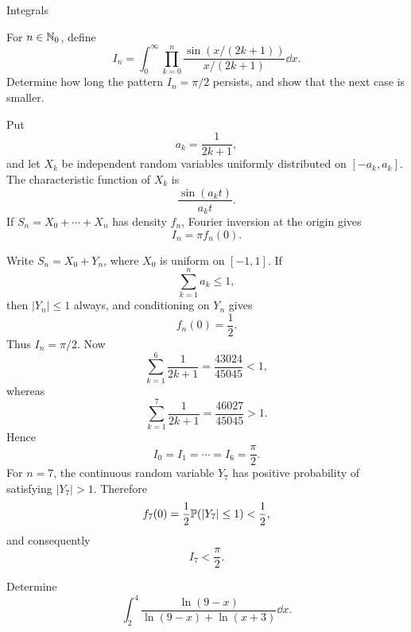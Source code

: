 \begin{expectedproblemgroup}{Integrals}
        \begin{expectedsubproblem}
            For $n\in\mathbb{N}_0$, define
            \[
                I_n
                =
                \int_0^{\infty}
                \prod_{k=0}^{n}
                \frac{\sin(x/(2k+1))}{x/(2k+1)}\dd x.
            \]
            Determine how long the pattern $I_n=\pi/2$ persists, and show that
            the next case is smaller.
        \end{expectedsubproblem}

        \begin{expectedsubsolution}
            Put
            \[
                a_k=\frac{1}{2k+1},
            \]
            and let $X_k$ be independent random variables uniformly distributed on
            $[-a_k,a_k]$. The characteristic function of $X_k$ is
            \[
                \frac{\sin(a_k t)}{a_k t}.
            \]
            If $S_n=X_0+\cdots+X_n$ has density $f_n$, Fourier inversion at the
            origin gives
            \[
                I_n=\pi f_n(0).
            \]

            Write $S_n=X_0+Y_n$, where $X_0$ is uniform on $[-1,1]$. If
            \[
                \sum_{k=1}^{n}a_k\leq1,
            \]
            then $|Y_n|\leq1$ always, and conditioning on $Y_n$ gives
            \[
                f_n(0)=\frac12.
            \]
            Thus $I_n=\pi/2$. Now
            \[
                \sum_{k=1}^{6}\frac{1}{2k+1}
                =
                \frac{43024}{45045}<1,
            \]
            whereas
            \[
                \sum_{k=1}^{7}\frac{1}{2k+1}
                =
                \frac{46027}{45045}>1.
            \]
            Hence
            \[
                \boxed{I_0=I_1=\cdots=I_6=\frac{\pi}{2}}.
            \]
            For $n=7$, the continuous random variable $Y_7$ has positive
            probability of satisfying $|Y_7|>1$. Therefore
            \[
                f_7(0)
                =
                \frac12\mathbb{P}(|Y_7|\leq1)
                <
                \frac12,
            \]
            and consequently
            \[
                \boxed{I_7<\frac{\pi}{2}}.
            \]
        \end{expectedsubsolution}

        \begin{expectedsubproblem}[1987 Putnam]
            Determine
            \[
                \int_2^4
                \frac{\ln(9-x)}{
                    \ln(9-x)+\ln(x+3)
                }
                \dd x.
            \]
        \end{expectedsubproblem}


\end{expectedproblemgroup}
